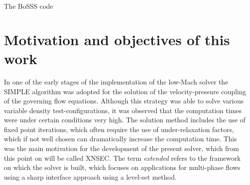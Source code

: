 



The \gls{BoSSS} code 


\section{Motivation and objectives of this work}

In one of the early stages of the implementation of the low-Mach solver the SIMPLE algorithm was adopted for the solution of the velocity-pressure coupling of the governing flow equations. Although this strategy was able to solve various variable density test-configurations, it was observed that the computation times were under certain conditions very high. The solution method includes the use of fixed point iterations, which often require the use of under-relaxation factors, which if not well chosen can dramatically increase the computation time. This was the main motivation for the development of the present solver, which from this point on will be called \gls{XNSEC}. The term \textit{extended} refers to the framework on which the solver is built, which focuses on applications for multi-phase flows using a sharp interface approach using a level-set method. 

